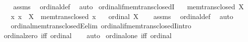 \begin{isabellebody}
%
\isadelimproof
\ \ %
\endisadelimproof
%
\isatagproof
{}\isamarkupfalse%
\ assms\ \isamarkupfalse%
\ ordinal{\isacharunderscore}{\kern0pt}def\ \isamarkupfalse%
\ auto%
\endisatagproof
{\isafoldproof}%
%
\isadelimproof
\isanewline
%
\endisadelimproof
\isanewline
{}\isamarkupfalse%
\ ordinal{\isacharunderscore}{\kern0pt}if{\isacharunderscore}{\kern0pt}mem{\isacharunderscore}{\kern0pt}trans{\isacharunderscore}{\kern0pt}closedI{\isacharcolon}{\kern0pt}\isanewline
\ \ \ {\isachardoublequoteopen}mem{\isacharunderscore}{\kern0pt}trans{\isacharunderscore}{\kern0pt}closed\ X{\isachardoublequoteclose}\isanewline
\ \ \ {\isachardoublequoteopen}{\isasymAnd}x{\isachardot}{\kern0pt}\ x\ {\isasymin}\ X\ {\isasymLongrightarrow}\ mem{\isacharunderscore}{\kern0pt}trans{\isacharunderscore}{\kern0pt}closed\ x{\isachardoublequoteclose}\isanewline
\ \ \ {\isachardoublequoteopen}ordinal\ X{\isachardoublequoteclose}\isanewline
%
\isadelimproof
\ \ %
\endisadelimproof
%
\isatagproof
{}\isamarkupfalse%
\ assms\ \isamarkupfalse%
\ ordinal{\isacharunderscore}{\kern0pt}def\ \isamarkupfalse%
\ auto%
\endisatagproof
{\isafoldproof}%
%
\isadelimproof
\isanewline
%
\endisadelimproof
\isanewline
{}\isamarkupfalse%
\isanewline
\ \ \ ordinal{\isacharunderscore}{\kern0pt}mem{\isacharunderscore}{\kern0pt}trans{\isacharunderscore}{\kern0pt}closedE{\isacharbrackleft}{\kern0pt}elim{\isacharbang}{\kern0pt}{\isacharbrackright}{\kern0pt}\ ordinal{\isacharunderscore}{\kern0pt}if{\isacharunderscore}{\kern0pt}mem{\isacharunderscore}{\kern0pt}trans{\isacharunderscore}{\kern0pt}closedI{\isacharbrackleft}{\kern0pt}intro{\isacharbang}{\kern0pt}{\isacharbrackright}{\kern0pt}\isanewline
{}\isanewline
\isanewline
{}\isamarkupfalse%
\ ordinal{\isacharunderscore}{\kern0pt}zero\ {\isacharbrackleft}{\kern0pt}iff{\isacharbrackright}{\kern0pt}{\isacharcolon}{\kern0pt}\ {\isachardoublequoteopen}ordinal\ {}{\isachardoublequoteclose}%
\isadelimproof
\ %
\endisadelimproof
%
\isatagproof
{}\isamarkupfalse%
\ auto%
\endisatagproof
{\isafoldproof}%
%
\isadelimproof
%
\endisadelimproof
\isanewline
\isanewline
{}\isamarkupfalse%
\ ordinal{\isacharunderscore}{\kern0pt}one\ {\isacharbrackleft}{\kern0pt}iff{\isacharbrackright}{\kern0pt}{\isacharcolon}{\kern0pt}\ {\isachardoublequoteopen}ordinal\ {}{\isachardoublequoteclose}%
\isadelimproof

\end{isabellebody}
